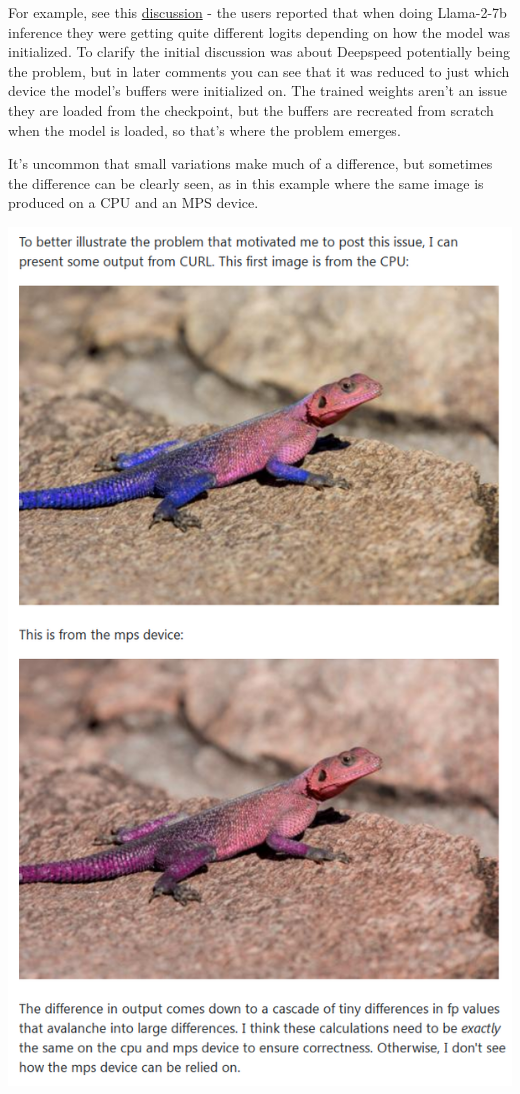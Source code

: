 \documentclass[
]{report}
\begin{document}
For example, see this
\href{https://github.com/microsoft/DeepSpeed/issues/4932}{discussion} -
the users reported that when doing Llama-2-7b inference they were
getting quite different logits depending on how the model was
initialized. To clarify the initial discussion was about Deepspeed
potentially being the problem, but in later comments you can see that it
was reduced to just which device the model's buffers were initialized
on. The trained weights aren't an issue they are loaded from the
checkpoint, but the buffers are recreated from scratch when the model is
loaded, so that's where the problem emerges.

It's uncommon that small variations make much of a difference, but
sometimes the difference can be clearly seen, as in this example where
the same image is produced on a CPU and an MPS device.

\includegraphics{images/math-fp-discrepancy-outcome-lizard.png}
\end{document}
